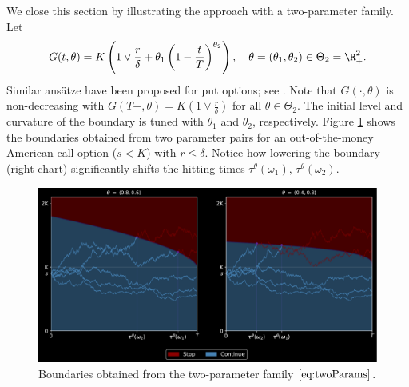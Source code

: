  
 We close this section by illustrating the approach with a two-parameter family. Let
 \begin{equation}\label{eq:twoParams}
     G(t,\theta) = K\left(1 \vee \frac{r}{\delta}+ \theta_1  \left(1-\frac{t}{T} \right)^{\theta_2} \right), \quad \theta = 
     (\theta_1,\theta_2) \in \Theta_2 = \R^2_+.
 \end{equation}
 Similar ansätze %
 have been 
 proposed %
 for put options; see \cite{Garcia,Little}.  %
 Note that $G(\cdot,\theta)$ is non-decreasing with  $G(T-,\theta) = K(1 \vee \frac{r}{\delta})$ for all $\theta \in \Theta_2$. The initial level and curvature of the boundary is tuned with $\theta_1$ and $\theta_2$, respectively. %
 Figure \ref{fig:twoParams} shows the boundaries obtained from two parameter pairs for an out-of-the-money American call option ($s < K$) with $r\le \delta$. Notice how  lowering the boundary (right chart) significantly shifts the hitting times $\tau^{\theta}(\omega_1),\,\tau^{\theta}(\omega_2)$. %
 
 
 \begin{figure}
     \centering
     \includegraphics[scale=0.5]{FB/Figures/twoParams.pdf}
     \caption{Boundaries obtained from the two-parameter family $\eqref{eq:twoParams}$.}
     \label{fig:twoParams}
 \end{figure}
 
 

 
 
 
 
